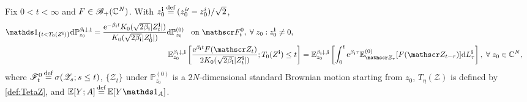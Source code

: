 \documentclass[12pt, twoside]{article}
\numberwithin{figure}{section}
\newcommand{\e}{{\mathrm e}}
\newcommand{\1}{\mathds 1}
\newcommand{\F}{\mathscr F}
\newcommand{\B}{\mathscr B}
\newcommand{\da}{{\downarrow}}
\newcommand{\ms}{\mathscr}
\renewcommand{\P}{{\mathbb P}}
\newcommand{\E}{{\mathbb E}}
\renewcommand{\d}{{\mathrm d}}
\newcommand{\2}{{\mathbf 1}}
\newcommand{\defeq}{{\stackrel{\rm def}{=}}}
\newcommand{\cc}{{^\circ}}
\newcommand{\bi}{\mathbf i}
\newcommand{\two}{{\sqrt{2}}}
\newcommand{\CN}{{\mathbb C}^{\it N}}
\begin{document}
\begin{thm}
\noindent {\rm (4$\cc$)} Fix $0<t<\infty$ and $F\in \B_+(\CN)$. With $z_0^\bi\,\defeq\,(z_0^{i\prime}-z_0^i)/\two$, 
\begin{align}
\begin{split}
\label{DY:com}
\1_{\{t<T_0(Z^\bi)\}}\d \P_{z_0}^{\beta_\bi\da,\bi}&=\frac{\e^{-\beta_\bi t}K_0(\sqrt{2\beta_\bi}|Z^\bi_t|)}{K_0(\sqrt{2\beta_\bi}|Z^\bi_0|)}\d \P_{z_0}^{(0)}\;\;\mbox{ on }\F_t^0,\;\forall\; z_0:z_0^\bi\neq 0,
\end{split}\\
\E^{\beta_\bi\da,\bi}_{z_0}\left[\frac{\e^{\beta_\bi t}F(\ms Z_t)}{2K_0(\sqrt{2\beta_\bi}|Z^\bi_t|)};T_0(Z^\bi)\leq t\right]&=\E^{\beta_\bi\da,\bi}_{z_0}\left[\int_0^t\e^{\beta_\bi \tau}\E_{\ms Z_{\tau}}^{(0)}[F(\ms Z_{t-\tau})]
 \d L^\bi_\tau \right],\; \forall\; z_0\in \CN,\label{exp:LT}
\end{align}
where $\F_t^0\,\defeq\,\sigma(\ms Z_s;s\leq t)$, $\{\ms Z_t\}$ under $\P_{z_0}^{(0)}$ is a $2N$-dimensional standard Brownian motion starting from $z_0$, $T_\eta(\mathcal Z)$ is defined by \eqref{def:TetaZ}, and $\E[Y;A]\,\defeq\,\E[Y\1_A]$. 
\end{thm}
\end{document}
